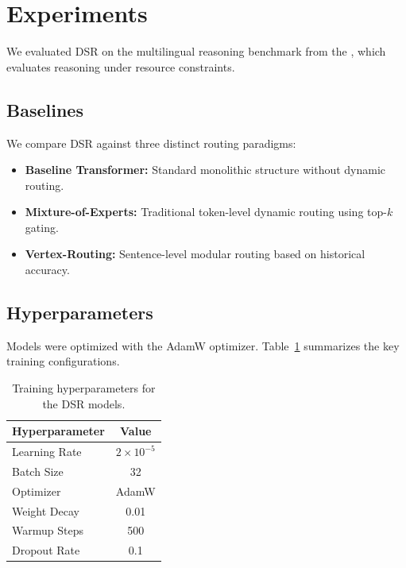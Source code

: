 \section{Experiments}
\label{sec:experiments}
We evaluated DSR on the multilingual reasoning benchmark from the \citet{synapsenexa2025benchmark}, which evaluates reasoning under resource constraints.

\subsection{Baselines}
We compare DSR against three distinct routing paradigms:
\begin{itemize}
  \item \textbf{Baseline Transformer:} Standard monolithic structure without dynamic routing.
  \item \textbf{Mixture-of-Experts:} Traditional token-level dynamic routing using top-$k$ gating.
  \item \textbf{Vertex-Routing:} Sentence-level modular routing based on historical accuracy.
\end{itemize}

\subsection{Hyperparameters}
Models were optimized with the AdamW optimizer. Table~\ref{tab:hyperparameters} summarizes the key training configurations.

\begin{table}[h]
  \centering
  \small
  \begin{tabular}{lc}
    \toprule
    \textbf{Hyperparameter} & \textbf{Value} \\
    \midrule
    Learning Rate & $2 \times 10^{-5}$ \\
    Batch Size & 32 \\
    Optimizer & AdamW \\
    Weight Decay & 0.01 \\
    Warmup Steps & 500 \\
    Dropout Rate & 0.1 \\
    \bottomrule
  \end{tabular}
  \caption{Training hyperparameters for the DSR models.}
  \label{tab:hyperparameters}
\end{table}
